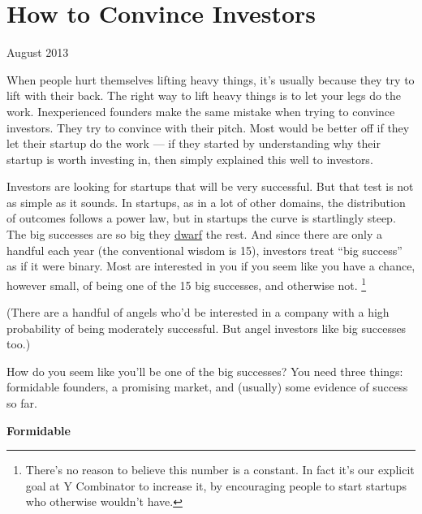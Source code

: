 \chapter{How to Convince Investors}

August 2013

When people hurt themselves lifting heavy things, it's usually because
they try to lift with their back. The right way to lift heavy things is
to let your legs do the work. Inexperienced founders make the same
mistake when trying to convince investors. They try to convince with
their pitch. Most would be better off if they let their startup do the
work --- if they started by understanding why their startup is worth
investing in, then simply explained this well to investors.

Investors are looking for startups that will be very successful. But
that test is not as simple as it sounds. In startups, as in a lot of
other domains, the distribution of outcomes follows a power law, but in
startups the curve is startlingly steep. The big successes are so big
they \href{swan.html}{dwarf} the rest. And since there are only a
handful each year (the conventional wisdom is 15), investors treat ``big
success'' as if it were binary. Most are interested in you if you seem
like you have a chance, however small, of being one of the 15 big
successes, and otherwise not. \footnote{There's no reason to believe this number is a constant. In fact
it's our explicit goal at Y Combinator to increase it, by encouraging
people to start startups who otherwise wouldn't have.}

(There are a handful of angels who'd be interested in a company with a
high probability of being moderately successful. But angel investors
like big successes too.)

How do you seem like you'll be one of the big successes? You need three
things: formidable founders, a promising market, and (usually) some
evidence of success so far.

\textbf{Formidable}

